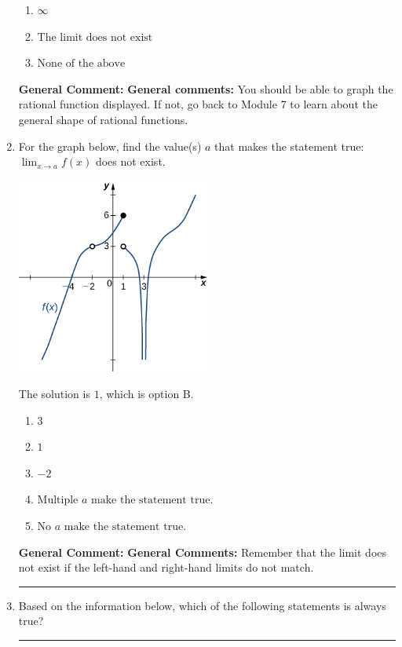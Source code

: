 \documentclass{extbook}[14pt]
\newcommand{\litem}[1]{\item #1

\rule{\textwidth}{0.4pt}}
\begin{document}
\begin{enumerate}
{\begin{enumerate}[label=\Alph*.]
\item \( \infty \)


\item \( \text{The limit does not exist} \)


\item \( \text{None of the above} \)


\end{enumerate}

\textbf{General Comment:} \textbf{General comments:} You should be able to graph the rational function displayed. If not, go back to Module 7 to learn about the general shape of rational functions.
}
\litem{
For the graph below, find the value(s) $a$ that makes the statement true: $ \displaystyle \lim_{x \rightarrow a} f(x)$ does not exist.

\begin{center}
    \includegraphics[width=0.5\textwidth]{../Figures/evaluateLimitGraphicallyCopyA.png}
\end{center}


The solution is \( 1 \), which is option B.\begin{enumerate}[label=\Alph*.]
\item \( 3 \)


\item \( 1 \)


\item \( -2 \)


\item \( \text{Multiple } a \text{ make the statement true}. \)


\item \( \text{No } a \text{ make the statement true}. \)


\end{enumerate}

\textbf{General Comment:} \textbf{General Comments:} Remember that the limit does not exist if the left-hand and right-hand limits do not match.
}
\litem{
Based on the information below, which of the following statements is always true?

}
\end{enumerate}
\end{document}
